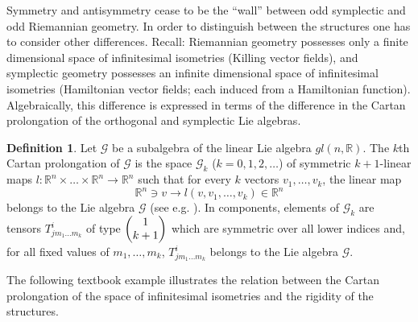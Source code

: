 \documentclass[12pt,reqno,a4paper]{amsart}
\theoremstyle{definition}
\newtheorem{definition}{Definition}
\begin{document}
 Symmetry and antisymmetry cease to be the ``wall'' between odd
symplectic and odd Riemannian geometry. In order to distinguish between the
 structures one has to consider  other differences. Recall:
 Riemannian geometry possesses only a finite dimensional space of infinitesimal
 isometries (Killing vector fields), and symplectic geometry possesses an
 infinite dimensional space of infinitesimal isometries (Hamiltonian vector
 fields; each induced from a Hamiltonian function). Algebraically, this difference
 is expressed in terms of the difference in the Cartan prolongation of the
 orthogonal and symplectic Lie algebras.
\begin{definition}
Let ${{\mathcal{G}}}$ be a subalgebra of the linear Lie algebra $gl(n,{\mathbb{R}})$. The $k$th
Cartan prolongation of ${{\mathcal{G}}}$ is the space ${{\mathcal{G}}}_k$ ($k=0,1,2,\dots$) of symmetric
$k+1$-linear maps $l:{\mathbb{R}}^n\times\dots\times {\mathbb{R}}^n\to {\mathbb{R}}^n$ such that for every
$k$ vectors $v_1,\dots,v_k$, the linear map
    \begin{equation*}
    {\mathbb{R}}^n\ni v\to l(v,v_1,\dots,v_k)\in {\mathbb{R}}^n
    \end{equation*}
belongs to the Lie algebra ${{\mathcal{G}}}$ (see e.g. \cite{K1}). In components,
 elements of ${{\mathcal{G}}}_k$ are tensors $T^i_{jm_1\dots m_k}$ of type $\begin{pmatrix}1\cr k+1\end{pmatrix}$
 which are symmetric over all lower indices and, for all fixed values of
  $m_1,\ldots,m_k$, $T^i_{jm_1\dots m_k}$ belongs to the Lie algebra ${{\mathcal{G}}}$.
\end{definition}
The following textbook example illustrates the relation between the Cartan
prolongation of the space of infinitesimal isometries and the rigidity of the structures.
\end{document}
